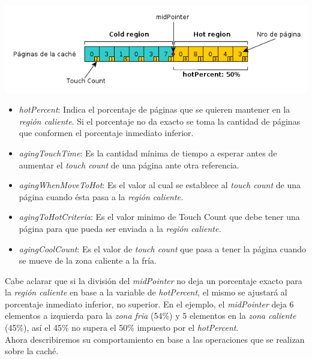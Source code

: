 \documentclass[11pt, a4paper, spanish]{article}
\begin{document}
\begin{center}
	\includegraphics[scale=0.65]{diagramas/TouchCountAlgorithm1.png}\\
\end{center}

\begin{itemize}
	\item{\emph{hotPercent}: Indica el porcentaje de p\'aginas que se quieren mantener en la \textit{regi\'on caliente}. Si el porcentaje no
da exacto se toma la cantidad de p\'aginas que conformen el porcentaje inmediato inferior. }
	\item{\emph{agingTouchTime}: Es la cantidad m\'inima de tiempo a esperar antes de aumentar el \textit{touch count}  de una p\'agina ante otra referencia.}
	\item{\emph{agingWhenMoveToHot}: Es el valor al cual se establece al \textit{touch count} de una p\'agina cuando \'esta pasa a la \textit{regi\'on caliente.} }
	\item{\emph{agingToHotCriteria}: Es el valor minimo de Touch Count que debe tener una p\'agina para que pueda ser enviada a la \textit{regi\'on caliente.}}
	\item{\emph{agingCoolCount}: Es el valor de \textit{touch count} que pasa a tener la p\'agina cuando se mueve de la zona caliente a la fr\'ia.}
\end{itemize}

\newpage
Cabe aclarar que si la divisi\'on del \textit{midPointer} no deja un porcentaje exacto para la \textit{regi\'on caliente} en base a la variable 
de \textit{hotPercent}, el mismo se ajustar\'a al porcentaje inmediato inferior, no superior. 
En el ejemplo, el \textit{midPointer} deja 6 elementos a izquierda para la \textit{zona fria} (54\%)
y 5 elementos en la \textit{zona caliente} (45\%), as\'i el 45\% no supera el 50\% impuesto por el \textit{hotPercent}. \\

Ahora describiremos su comportamiento en base a las operaciones que se realizan sobre la cach\'e.
\end{document}

